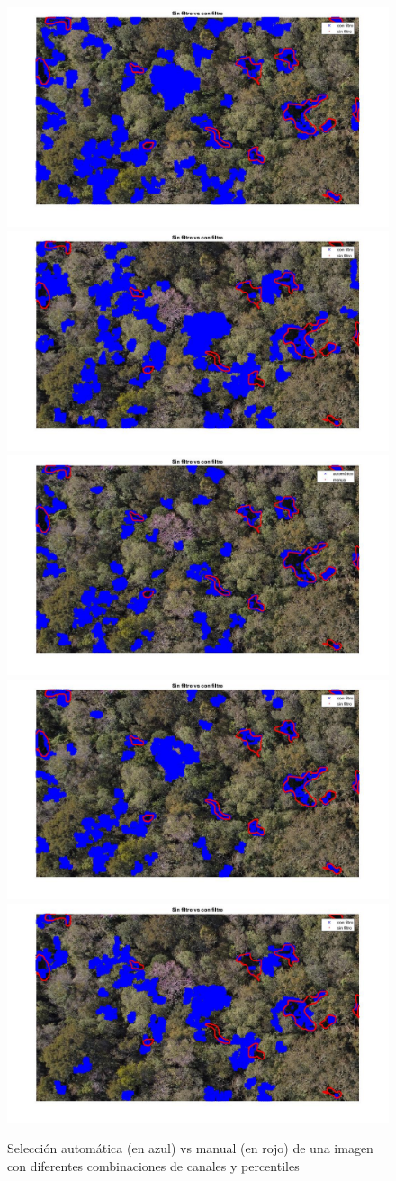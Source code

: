 \begin{figure}
    \includegraphics[width=.3\textwidth]{Imagenes/IIC/p85/BG/260a.jpg}\hfill
    \includegraphics[width=.3\textwidth]{Imagenes/IIC/p85/GR/260a.jpg}\hfill
    \\[\smallskipamount]
    \includegraphics[width=.3\textwidth]{Imagenes/IIC/p90/BR/260a.jpg}\hfill
    \includegraphics[width=.3\textwidth]{Imagenes/IIC/p90/BG/260a.jpg}\hfill
    \includegraphics[width=.3\textwidth]{Imagenes/IIC/p90/GR/260a.jpg}\hfill
    
    \caption{Selección automática (en azul) vs manual (en rojo) de una imagen con diferentes combinaciones de canales y percentiles}
\end{figure}\label{dji260}

